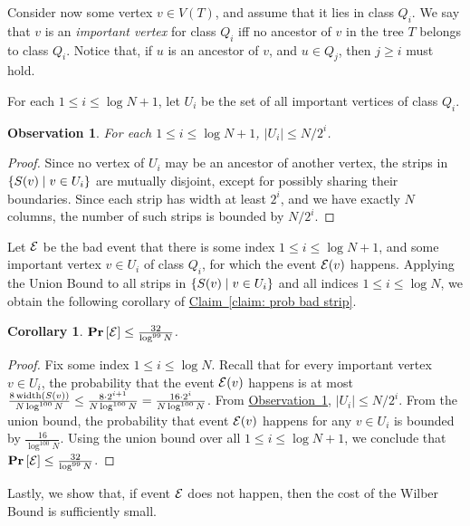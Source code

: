 \documentclass[11pt]{article}
\numberwithin{equation}{section}
\newtheorem{corollary}[theorem]{Corollary}
\theoremstyle{definition}
\theoremstyle{plain}
\newcommand{\expref}[2]{\hyperref[#2]{#1~\ref{#2}}}
\newtheorem{myobs}[theorem]{Observation}
\begin{document}
Consider now some vertex $v\in V(T)$, and assume that it lies in class $Q_i$. We say that $v$ is an \emph{important vertex} for class $Q_i$ iff no ancestor of $v$ in the tree $T$ belongs to class $Q_i$. Notice that, if $u$ is an ancestor of $v$, and $u\in Q_j$, then $j\geq i$ must hold.

For each $1\leq i\leq \log N+1$, let $U_i$ be the set of all important vertices of class $Q_i$. 

\begin{myobs}
\label{obs: bounded U_i} 
For each $1\leq i\leq \log N+1$, $|U_i| \leq N/2^i$. 
\end{myobs}
\begin{proof}
Since no vertex of $U_i$ may be an ancestor of another vertex, the strips in $\left\{ S(v)\mid v\in U_i \right\}$ are mutually disjoint, except for possibly sharing their boundaries. 
Since each strip has width at least $2^i$, and we have exactly $N$ columns, the number of such strips is bounded by $N/2^i$. 
\end{proof}  



Let ${\cal{E}}$ be the bad event that there is some index $1\leq i\leq \log N+1$, and some important vertex $v\in U_i$ of class $Q_i$, for which  the event ${\cal{E}}(v)$ happens. 
Applying the Union Bound to all strips in $\left\{ S(v)\mid v\in U_i \right\}$ and  all indices $1\leq i\leq \log N$, we obtain the following corollary of \expref{Claim}{claim: prob bad strip}.



\begin{corollary}\label{cor: no bad important strips}
	 $\text{\bf Pr}\left [{\cal{E}}\right]\leq \frac{32}{\log^{99}N}$.
\end{corollary}
\begin{proof}
	Fix some index $1\leq i\leq \log N$. Recall that for every important vertex $v\in U_i$, the probability that the event ${\cal{E}}(v)$ happens is at most $\frac{8\operatorname{width}(S(v))}{N\log^{100} N}\leq \frac{8\cdot 2^{i+1}}{N\log^{100}N}=\frac{16\cdot 2^{i}}{N\log^{100}N}$. 
From \expref{Observation}{obs: bounded U_i}, $|U_i|\leq N/2^i$. 
From the union bound, the probability that event ${\cal{E}}(v)$ happens for any $v\in U_i$ is bounded by $\frac{16}{\log^{100}N}$. 
Using the union bound over all  $1\leq i\leq \log N+1$, we conclude that  $\text{\bf Pr}\left [{\cal{E}}\right]\leq \frac{32}{\log^{99}N}$.
\end{proof}



Lastly, we show that, if event ${\cal{E}}$ does not happen, then the cost of the Wilber Bound is sufficiently small.
	
\end{document}
